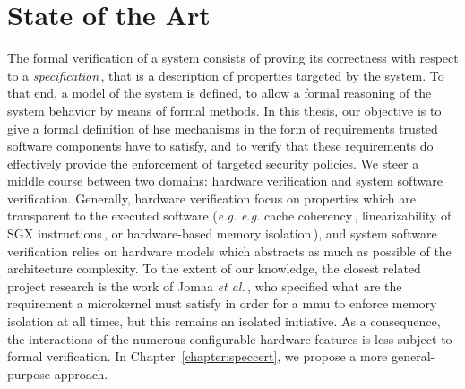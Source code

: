 \chapter{State of the Art}
\label{chapter:relatedwork}



%
\noindent
%
The formal verification of a system consists of proving its correctness with
respect to a \emph{specification}\,\cite{gupta1992formal}, that is a description
of properties targeted by the system.
%
To that end, a model of the system is defined, to allow a formal reasoning of
the system behavior by means of formal methods.
%
%
In this thesis, our objective is to give a formal definition of \ac{hse}
mechanisms in the form of requirements trusted software components have to
satisfy, and to verify that these requirements do effectively provide the
enforcement of targeted security policies.
%
We steer a middle course between two domains: hardware verification and system
software verification.
%
Generally, hardware verification focus on properties which are transparent to
the executed software (\emph{e.g.} \emph{e.g.} cache
coherency\,\cite{stern1995cachecoherence}, linearizability of SGX
instructions\,\cite{leslie2015linsgx}, or hardware-based memory
isolation\,\cite{lie2003xom}), and system software verification relies on
hardware models which abstracts as much as possible of the architecture
complexity.
%
To the extent of our knowledge, the closest related project research is the work
of Jomaa \emph{et al.}\,\cite{jomaa2016mmu}, who specified what are the
requirement a microkernel must satisfy in order for a \ac{mmu} to enforce memory
isolation at all times, but this remains an isolated initiative.
%
As a consequence, the interactions of the numerous configurable hardware
features is less subject to formal verification.
%
In Chapter~\ref{chapter:speccert}, we propose a more general-purpose approach.

